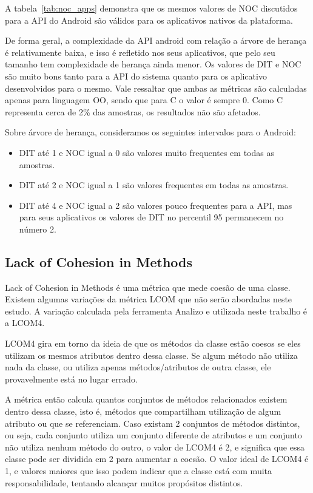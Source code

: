 A tabela~\ref{tab:noc_apps} demonstra que os mesmos valores de NOC discutidos para a API do Android são válidos para os aplicativos nativos da plataforma. 

De forma geral, a complexidade da API android com relação a árvore de herança é relativamente baixa, e isso é refletido nos seus aplicativos, que pelo seu tamanho tem complexidade de herança ainda menor. Os valores de DIT e NOC são muito bons tanto para a API do sistema quanto para os aplicativo desenvolvidos para o mesmo. Vale ressaltar que ambas as métricas são calculadas apenas para linguagem OO, sendo que para C o valor é sempre 0. Como C representa cerca de 2\% das amostras, os resultados não são afetados.

Sobre árvore de herança, consideramos os seguintes intervalos para o Android:

\begin{itemize}
\item DIT até 1 e NOC igual a 0 são valores muito frequentes em todas as amostras.
\item DIT até 2 e NOC igual a 1 são valores frequentes em todas as amostras.
\item DIT até 4 e NOC igual a 2 são valores pouco frequentes para a API, mas para seus aplicativos os valores de DIT no percentil 95 permanecem no número 2.
\end{itemize}

\subsection{Lack of Cohesion in Methods}

Lack of Cohesion in Methods é uma métrica que mede coesão de uma classe. Existem algumas variações da métrica LCOM que não serão abordadas neste estudo. A variação calculada pela ferramenta Analizo e utilizada neste trabalho é a LCOM4.

LCOM4 gira em torno da ideia de que os métodos da classe estão coesos se eles utilizam os mesmos atributos dentro dessa classe. Se algum método não utiliza nada da classe, ou utiliza apenas métodos/atributos de outra classe, ele provavelmente está no lugar errado. 

A métrica então calcula quantos conjuntos de métodos relacionados existem dentro dessa classe, isto é, métodos que compartilham utilização de algum atributo ou que se referenciam. Caso existam 2 conjuntos de métodos distintos, ou seja, cada conjunto utiliza um conjunto diferente de atributos e um conjunto não utiliza nenhum método do outro, o valor de LCOM4 é 2, e significa que essa classe pode ser dividida em 2 para aumentar a coesão. O valor ideal de LCOM4 é 1, e valores maiores que isso podem indicar que a classe está com muita responsabilidade, tentando alcançar muitos propósitos distintos.

